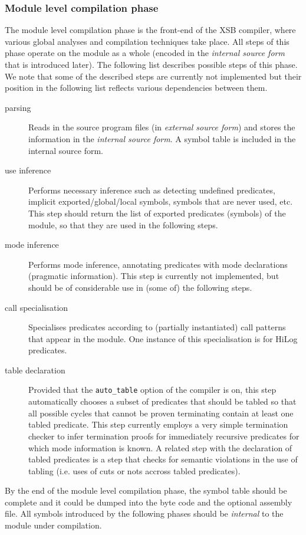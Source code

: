 \subsubsection{Module level compilation phase}
The module level compilation phase is the front-end of the XSB
compiler, where various global analyses and compilation techniques
take place.  All steps of this phase operate on the module as a whole
(encoded in the {\it internal source form} that is introduced later).
The following list describes possible steps of this phase.  We note
that some of the described steps are currently not implemented but their
position in the following list reflects various dependencies between them.
\begin{description}
\item[parsing]
	Reads in the source program files (in {\it external source form})
	and stores the information in the {\it internal source form}.
	A symbol table is included in the internal source form.
\item[use inference]
	Performs necessary inference such as detecting undefined predicates,
	implicit exported/global/local symbols, symbols that are never
	used, etc.  This step should return the list of exported
	predicates (symbols) of the module, so that they are used in
	the following steps.
\item[mode inference]
	Performs mode inference, annotating predicates with mode declarations
	(pragmatic information).  This step is currently not implemented,
	but should be of considerable use in (some of) the following steps.
\item[call specialisation]
	Specialises predicates according to (partially instantiated)
	call patterns that appear in the module.  One instance of this
	specialisation is for HiLog predicates.
\item[table declaration]
	Provided that the {\tt auto\_table} option of the compiler is
	on, this step automatically chooses a subset of predicates that
	should be tabled so that all possible cycles that cannot be proven
	terminating contain at least one tabled predicate.  This step
	currently employs a very simple termination checker to infer
	termination proofs for immediately recursive predicates for which
	mode information is known.
	A related step with the declaration of tabled predicates is a step
	that checks for semantic violations in the use of tabling
	(i.e. uses of cuts or nots accross tabled predicates).
\end{description}
By the end of the module level compilation phase, the symbol table
should be complete and it could be dumped into the byte code and the
optional assembly file.  All symbols introduced by the following
phases should be {\em internal\/} to the module under compilation.


